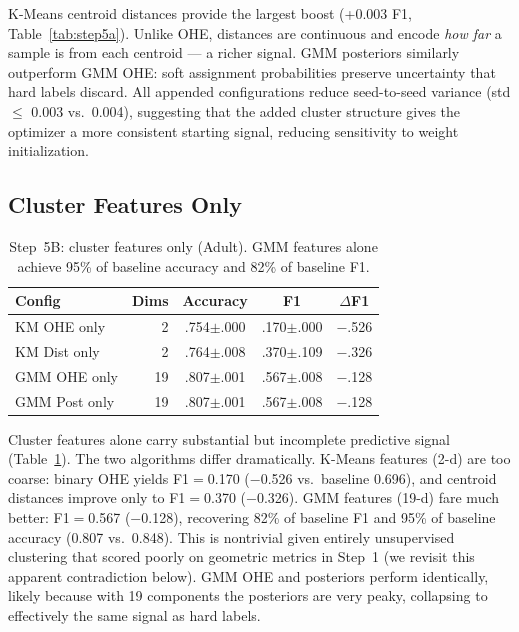 \documentclass[conference]{IEEEtran}
\begin{document}
K-Means centroid distances provide the largest boost (+0.003 F1,
Table~\ref{tab:step5a}). Unlike OHE, distances are continuous and
encode \emph{how far} a sample is from each centroid --- a richer
signal. GMM posteriors similarly outperform GMM OHE: soft assignment
probabilities preserve uncertainty that hard labels discard. All
appended configurations reduce seed-to-seed variance (std $\leq$ 0.003
vs.\ 0.004), suggesting that the added cluster structure gives the
optimizer a more consistent starting signal, reducing sensitivity to
weight initialization.

\subsection{Cluster Features Only}

\begin{table}[t]
\centering
\caption{Step~5B: cluster features only (Adult). GMM features alone
achieve 95\% of baseline accuracy and 82\% of baseline F1.}
\label{tab:step5b}
\begin{tabular}{lrccc}
\toprule
\textbf{Config} & \textbf{Dims} & \textbf{Accuracy} & \textbf{F1} & $\Delta$\textbf{F1} \\
\midrule
KM OHE only   &  2 & .754$\pm$.000 & .170$\pm$.000 & $-$.526 \\
KM Dist only  &  2 & .764$\pm$.008 & .370$\pm$.109 & $-$.326 \\
GMM OHE only  & 19 & .807$\pm$.001 & .567$\pm$.008 & $-$.128 \\
GMM Post only & 19 & .807$\pm$.001 & .567$\pm$.008 & $-$.128 \\
\bottomrule
\end{tabular}
\end{table}

Cluster features alone carry substantial but incomplete predictive
signal (Table~\ref{tab:step5b}). The two algorithms differ
dramatically. K-Means features (2-d) are too coarse: binary OHE
yields F1$=$0.170 ($-$0.526 vs.\ baseline 0.696), and centroid
distances improve only to F1$=$0.370 ($-$0.326). GMM features (19-d)
fare much better: F1$=$0.567 ($-$0.128), recovering 82\% of baseline
F1 and 95\% of baseline accuracy (0.807 vs.\ 0.848). This is
nontrivial given entirely unsupervised clustering that scored poorly
on geometric metrics in Step~1 (we revisit this apparent
contradiction below). GMM OHE and posteriors perform identically,
likely because with 19 components the posteriors are very peaky,
collapsing to effectively the same signal as hard labels.
\end{document}

